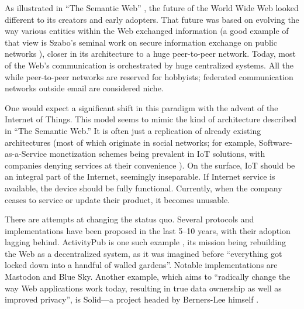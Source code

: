 \documentclass{article}
\begin{document}
As illustrated in “The Semantic Web” \cite{Lee1}, the future of the World Wide Web looked
different to its creators and early adopters. That future was based on evolving the way various
entities within the Web exchanged information (a good example of that view is Szabo’s seminal
work on secure information exchange on public networks \cite{Szabo}), closer in its architecture to a huge
peer-to-peer network. Today, most of the Web’s communication is orchestrated by huge
centralized systems. All the while peer-to-peer networks are reserved for hobbyists; federated
communication networks outside email are considered niche.

One would expect a significant shift in this paradigm with the advent of the Internet of
Things. This model seems to mimic the kind of architecture described in “The Semantic Web.” It
is often just a replication of already existing architectures (most of which originate in social
networks; for example, Software-as-a-Service monetization schemes being prevalent in IoT
solutions, with companies denying services at their convenience \cite{Acoba,Gitlin,Hamzelou}). On the surface, IoT
should be an integral part of the Internet, seemingly inseparable. If Internet service is available,
the device should be fully functional. Currently, when the company ceases to service or update
their product, it becomes unusable.

There are attempts at changing the status quo. Several protocols and implementations have
been proposed in the last 5--10 years, with their adoption lagging behind. ActivityPub is one such
example \cite{Lemmer}, its mission being rebuilding the Web as a decentralized system, as it was imagined
before “everything got locked down into a handful of walled gardens”. Notable implementations
are Mastodon and Blue Sky. Another example, which aims to “radically change the way Web
applications work today, resulting in true data ownership as well as improved privacy”, is Solid---a project headed by Berners-Lee himself \cite{Mansour}.
\end{document}
